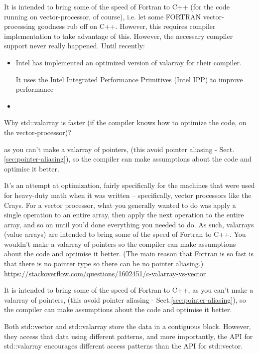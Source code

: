 \begin{mdframed}

  It is intended to bring some of the speed of Fortran to C++ (for the code
  running on vector-processor, of course), i.e. let some FORTRAN
  vector-processing goodness rub off on C++.
  However, this requires compiler implementation to take advantage of this.
  However, the necessary compiler support never really happened.
  Until recently:
  \begin{itemize}
  \item  Intel has implemented an optimized version of valarray for their compiler. 
  
  It uses the Intel Integrated Performance Primitives (Intel IPP) to improve performance
  
  \item 
  \end{itemize}

  Why std::valarray is faster (if the compiler knows how to optimize the code, on the vector-processor)? 
  
  as you can't make a valarray of pointers, (this avoid pointer aliasing -
  Sect.\ref{sec:pointer-aliasing}), so the compiler can make assumptions about
  the code and optimise it better.
  
It's an attempt at optimization, fairly specifically for the machines that
were used for heavy-duty math when it was written -- specifically, vector
processors like the Crays. For a vector processor, what you generally wanted to
do was apply a single operation to an entire array, then apply the next
operation to the entire array, and so on until you'd done everything you needed
to do. As such, valarrays (value arrays) are intended to bring some
of the speed of Fortran to C++. You wouldn't make a valarray of pointers so the
compiler can make assumptions about the code and optimise it better. (The main
reason that Fortran is so fast is that there is no pointer type so there can be
no pointer aliasing.)
\url{https://stackoverflow.com/questions/1602451/c-valarray-vs-vector}

  It is intended to bring some of the speed of Fortran to C++, as you can't make
  a valarray of pointers, (this avoid pointer aliasing -
  Sect.\ref{sec:pointer-aliasing}), so the compiler can make assumptions about
  the code and optimise it better.
\end{mdframed}

Both std::vector and std::valarray store the data in a contiguous block.
However, they access that data using different patterns, and more importantly,
the API for std::valarray encourages different access patterns than the API for
std::vector.

